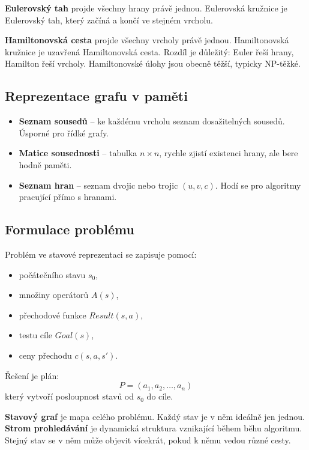 \textbf{Eulerovský tah} projde všechny hrany právě jednou. Eulerovská kružnice je Eulerovský tah, který začíná a končí ve stejném vrcholu.

\textbf{Hamiltonovská cesta} projde všechny vrcholy právě jednou. Hamiltonovská kružnice je uzavřená Hamiltonovská cesta. Rozdíl je důležitý: Euler řeší hrany, Hamilton řeší vrcholy. Hamiltonovské úlohy jsou obecně těžší, typicky NP-těžké.

\subsection*{Reprezentace grafu v paměti}
\begin{itemize}
    \item \textbf{Seznam sousedů} -- ke každému vrcholu seznam dosažitelných sousedů. Úsporné pro řídké grafy.
    \item \textbf{Matice sousednosti} -- tabulka \(n \times n\), rychle zjistí existenci hrany, ale bere hodně paměti.
    \item \textbf{Seznam hran} -- seznam dvojic nebo trojic \((u,v,c)\). Hodí se pro algoritmy pracující přímo s hranami.
\end{itemize}

\subsection*{Formulace problému}
Problém ve stavové reprezentaci se zapisuje pomocí:
\begin{itemize}
    \item počátečního stavu \(s_0\),
    \item množiny operátorů \(A(s)\),
    \item přechodové funkce \(Result(s,a)\),
    \item testu cíle \(Goal(s)\),
    \item ceny přechodu \(c(s,a,s')\).
\end{itemize}

Řešení je plán:
\begin{equation}
    P=(a_1,a_2,\dots,a_n)
\end{equation}
který vytvoří posloupnost stavů od \(s_0\) do cíle.

\textbf{Stavový graf} je mapa celého problému. Každý stav je v něm ideálně jen jednou. \textbf{Strom prohledávání} je dynamická struktura vznikající během běhu algoritmu. Stejný stav se v něm může objevit vícekrát, pokud k němu vedou různé cesty.

